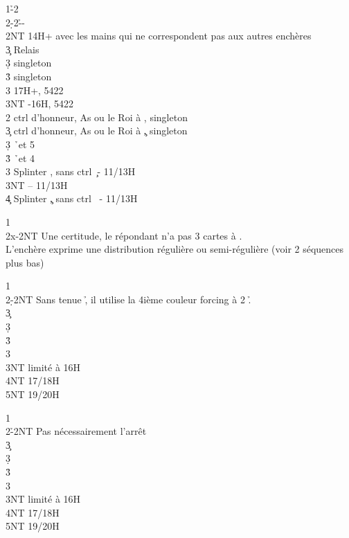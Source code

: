 \documentclass[a4paper]{article}
\begin{document}
\begin{bidtable}
1\h-2\c\\
2\d-2\h--\\
2NT \> 14H+ avec les mains qui ne correspondent pas aux autres enchères\+\\
3\c \> Relais\+\\
3\d \> singleton \c \\
3\h \> singleton \s \\
3\s \> 17H+, 5422\\
3NT -16H, 5422\-\-\\
2\s \> ctrl d’honneur, As ou le Roi à \s , singleton \c \\
3\c \> ctrl d’honneur, As ou le Roi à \c , singleton \s \\
3\d {} \h\ et 5 \d \\
3\h {} \h\ et 4 \d \\
3\s \> Splinter \s , sans ctrl \c\ - 11/13H\\
3NT  – 11/13H\\
4\c \> Splinter \c , sans ctrl \s\ - 11/13H
\end{bidtable}

\begin{bidtable}
1\c\\
2x-2NT \> Une certitude, le répondant n’a pas 3 cartes à \s .\+\\
L’enchère \> exprime une distribution régulière ou semi-régulière (voir 2 séquences plus bas)\-
\end{bidtable}

\begin{bidtable}
1\c\\
2\d-2NT \> Sans tenue \h , il utilise la 4ième couleur forcing à 2 \h .\\
3\c {}\\
3\d {}\\
3\h {}\\
3\s {}\\
3NT  limité à 16H\\
4NT  17/18H\\
5NT  19/20H
\end{bidtable}

\begin{bidtable}
1\c\\
2\h-2NT \> Pas nécessairement l’arrêt \d \\
3\c {}\\
3\d {}\\
3\h {}\\
3\s {}\\
3NT  limité à 16H\\
4NT  17/18H\\
5NT  19/20H
\end{bidtable}
\end{document}
